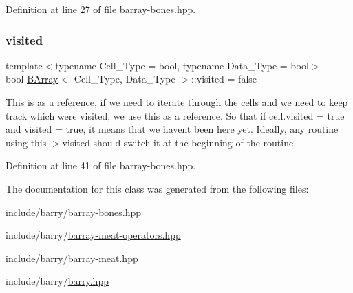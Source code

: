 Definition at line 27 of file barray-\/bones.\+hpp.

\mbox{\label{class_b_array_ae0860bf21425397d1498f94da6518e85}} 
\subsubsection{\texorpdfstring{visited}{visited}}
{\footnotesize\ttfamily template$<$typename Cell\+\_\+\+Type = bool, typename Data\+\_\+\+Type = bool$>$ \\
bool \hyperlink{class_b_array}{B\+Array}$<$ Cell\+\_\+\+Type, Data\+\_\+\+Type $>$\+::visited = false}

This is as a reference, if we need to iterate through the cells and we need to keep track which were visited, we use this as a reference. So that if cell.\+visited = true and visited = true, it means that we haven\textquotesingle{}t been here yet. Ideally, any routine using this-\/$>$visited should switch it at the beginning of the routine. 

Definition at line 41 of file barray-\/bones.\+hpp.



The documentation for this class was generated from the following files\+:\begin{DoxyCompactItemize}
\item 
include/barry/\hyperlink{barray-bones_8hpp}{barray-\/bones.\+hpp}\item 
include/barry/\hyperlink{barray-meat-operators_8hpp}{barray-\/meat-\/operators.\+hpp}\item 
include/barry/\hyperlink{barray-meat_8hpp}{barray-\/meat.\+hpp}\item 
include/barry/\hyperlink{barry_8hpp}{barry.\+hpp}\end{DoxyCompactItemize}
